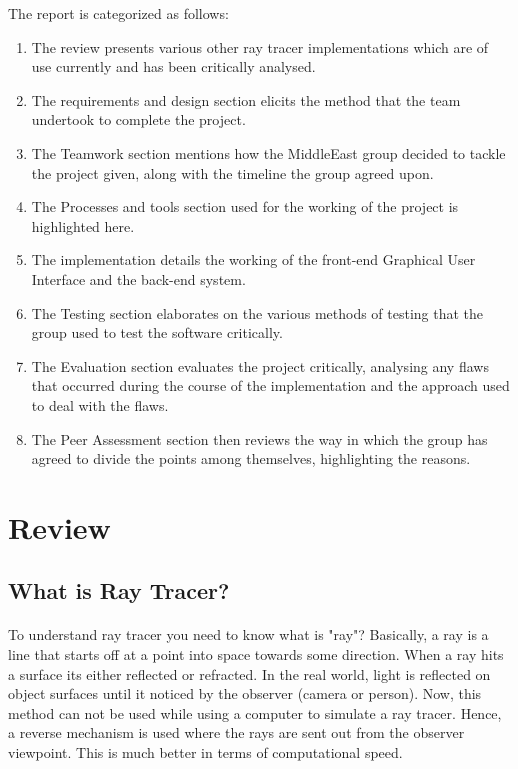 \documentclass{article}
\begin{document}
The report is categorized as follows:
\begin{enumerate}
     

\item The review presents various other ray tracer implementations which are of use currently and has been critically analysed.
\item The requirements and design section elicits the method that the team undertook to complete the project.
\item	The Teamwork section mentions how the MiddleEast group decided to tackle the project given, along with the timeline the group agreed upon. 
\item	The Processes and tools section used for the working of the project is highlighted here.
\item	The implementation details the working of the front-end Graphical User Interface and the back-end system.
\item	The Testing section elaborates on the various methods of testing that the group used to test the software critically.
\item	The Evaluation section evaluates the project critically, analysing any flaws that occurred during the course of the implementation and the approach used to deal with the flaws.
\item	The Peer Assessment section then reviews the way in which the group has agreed to divide the points among themselves, highlighting the reasons.
\end{enumerate}

\section{Review}
\subsection{What is Ray Tracer?}

\paragraph{}
To understand ray tracer you need to know what is "ray"? Basically, a ray is a line that starts off at a point into space towards some direction. When a ray hits a surface its either reflected or refracted.
In the real world, light is reflected on object surfaces until it noticed by the observer (camera or person). \newline Now, this method can not be used while using a computer to simulate a ray tracer. Hence, a reverse mechanism is used where the rays are sent out from the observer viewpoint. This is much better in terms of computational speed. 
\end{document}
